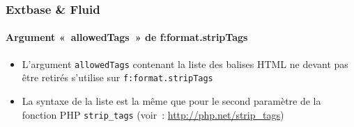 
\begin{frame}[fragile]
	\frametitle{Extbase \& Fluid}
	\framesubtitle{Argument «~allowedTags~» de f:format.stripTags}

	\begin{itemize}

		\item L'argument \texttt{allowedTags} contenant la liste des balises HTML ne
			devant pas être retirés s'utilise sur \texttt{f:format.stripTags}

		\item La syntaxe de la liste est la même que pour le second paramètre de la
			fonction PHP \texttt{strip\_tags} (voir~: \url{http://php.net/strip_tags})

	\end{itemize}

\end{frame}


